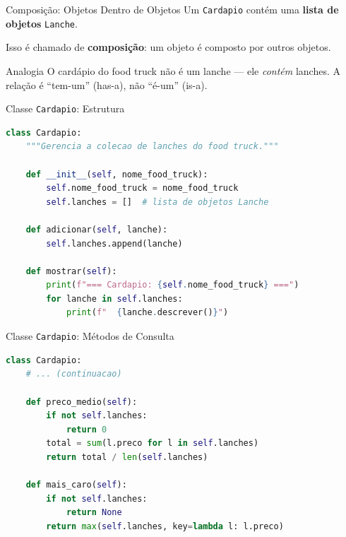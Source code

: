 \documentclass[aspectratio=169]{beamer}
\begin{document}
\begin{frame}{Composição: Objetos Dentro de Objetos}
  Um \texttt{Cardapio} contém uma \textbf{lista de objetos}
  \texttt{Lanche}.

  \vspace{0.3cm}
  Isso é chamado de \textbf{composição}: um objeto é composto
  por outros objetos.

  \vspace{0.3cm}
  \begin{block}{Analogia}
    O cardápio do food truck não é um lanche --- ele \emph{contém}
    lanches. A relação é ``tem-um'' (has-a), não ``é-um'' (is-a).
  \end{block}
\end{frame}

\begin{frame}[fragile]{Classe \texttt{Cardapio}: Estrutura}
  \begin{lstlisting}[language=Python]
class Cardapio:
    """Gerencia a colecao de lanches do food truck."""

    def __init__(self, nome_food_truck):
        self.nome_food_truck = nome_food_truck
        self.lanches = []  # lista de objetos Lanche

    def adicionar(self, lanche):
        self.lanches.append(lanche)

    def mostrar(self):
        print(f"=== Cardapio: {self.nome_food_truck} ===")
        for lanche in self.lanches:
            print(f"  {lanche.descrever()}")
  \end{lstlisting}
\end{frame}

\begin{frame}[fragile]{Classe \texttt{Cardapio}: Métodos de Consulta}
  \begin{lstlisting}[language=Python]
class Cardapio:
    # ... (continuacao)

    def preco_medio(self):
        if not self.lanches:
            return 0
        total = sum(l.preco for l in self.lanches)
        return total / len(self.lanches)

    def mais_caro(self):
        if not self.lanches:
            return None
        return max(self.lanches, key=lambda l: l.preco)
  \end{lstlisting}
\end{frame}
\end{document}
